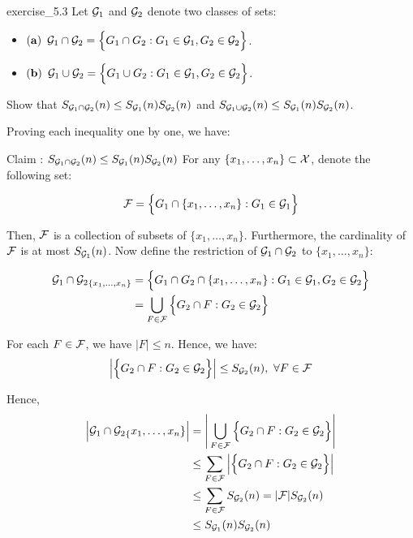 \begin{exercise}{}{exercise_5.3}
    Let $\mathcal{G}_1$ and $\mathcal{G}_2$ denote two classes of sets:
    \begin{itemize}
        \item ${\bf (a)}$ $\mathcal{G}_1 \cap \mathcal{G}_2=\Big\{ G_1\cap G_2: G_1\in\mathcal{G}_1, G_2 \in\mathcal{G}_2 \Big\}$.
        \item ${\bf (b)}$ $\mathcal{G}_1 \cup \mathcal{G}_2=\Big\{ G_1\cup G_2: G_1\in\mathcal{G}_1, G_2 \in\mathcal{G}_2 \Big\}$.
    \end{itemize}

    Show that $S_{\mathcal{G}_1\cap\mathcal{G}_2}(n) \le S_{\mathcal{G}_1}(n)S_{\mathcal{G}_2}(n)$ and $S_{\mathcal{G}_1\cup\mathcal{G}_2}(n) \le S_{\mathcal{G}_1}(n)S_{\mathcal{G}_2}(n)$.
\end{exercise}

\begin{solution*}
    Proving each inequality one by one, we have:
    \begin{subproof}{\newline Claim : $S_{\mathcal{G}_1 \cap \mathcal{G}_2}(n) \le S_{\mathcal{G}_1}(n)S_{\mathcal{G}_2}(n)$}
        For any $\{x_1, \dots, x_n\} \subset \mathcal{X}$, denote the following set:

        \begin{align*}
            \mathcal{F} = \Big\{ 
                G_1\cap\{x_1, \dots, x_n\} : G_1 \in \mathcal{G}_1
             \Big\}
        \end{align*}

        \noindent Then, $\mathcal{F}$ is a collection of subsets of $\{x_1, \dots, x_n\}$. Furthermore, the cardinality of $\mathcal{F}$ is at most $S_{\mathcal{G}_1}(n)$. Now define the restriction of $\mathcal{G}_1\cap\mathcal{G}_2$ to $\{x_1, \dots, x_n\}$:

        \begin{align*}
            {\mathcal{G}_1 \cap \mathcal{G}_2}_{\{x_1, \dots, x_n \}}
                &= \Big\{ 
                    G_1 \cap G_2 \cap \{ x_1, \dots, x_n \} : G_1 \in \mathcal{G}_1, G_2 \in \mathcal{G}_2
                 \Big\} \\
                &= \bigcup_{F \in \mathcal{F}} \Big\{ 
                    G_2 \cap F : G_2 \in \mathcal{G}_2
                 \Big\}
        \end{align*}

        \noindent For each $F\in\mathcal{F}$, we have $|F| \le n$. Hence, we have:
        \begin{align*}
            \Big| \Big\{ 
                G_2 \cap F : G_2 \in \mathcal{G}_2
             \Big\} \Big| \le S_{\mathcal{G}_2}(n), \ \forall F \in \mathcal{F}
        \end{align*}

        \noindent Hence,
        \begin{align*}
            \Big| {\mathcal{G}_1 \cap \mathcal{G}_2}_\{x_1, \dots, x_n \} \Big| 
                &= \Bigg| 
                    \bigcup_{F \in \mathcal{F}} \Big\{ 
                        G_2 \cap F : G_2 \in \mathcal{G}_2
                     \Big\}
                 \Bigg| \\
                &\le \sum_{F\in\mathcal{F}} \Big|  \Big\{ 
                    G_2 \cap F : G_2 \in \mathcal{G}_2
                 \Big\} \Big| \\
                &\le \sum_{F\in\mathcal{F}} S_{\mathcal{G}_2}(n) = |\mathcal{F}|S_{\mathcal{G}_2}(n) \\
                &\le S_{\mathcal{G}_1}(n) S_{\mathcal{G}_2}(n)
        \end{align*}


\end{subproof}
\end{solution*}
